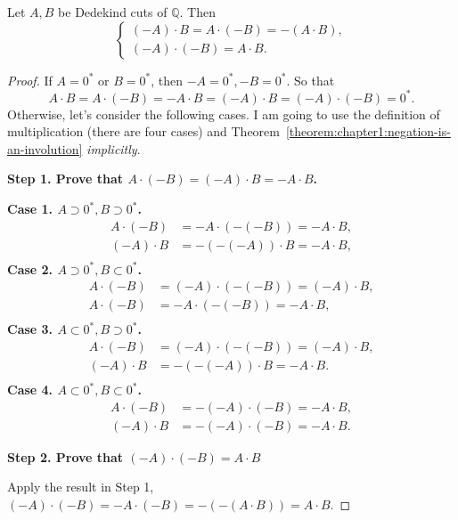 \begin{theorem}\label{theorem:chapter1:multiplication-and-negation}
    Let $A, B$ be Dedekind cuts of $\mathbb{Q}$. Then
    \[
        \begin{cases}
            (-A)\cdot B = A\cdot (-B) = -(A\cdot B), \\
            (-A)\cdot (-B) = A\cdot B.
        \end{cases}
    \]
\end{theorem}

\begin{proof}
    If $A = {0}^{*}$ or $B = {0}^{*}$, then $-A = {0}^{*}, -B = {0}^{*}$. So that
    \[
        A\cdot B = A\cdot (-B) = -A\cdot B = (-A)\cdot B = (-A)\cdot (-B) = {0}^{*}.
    \]
    Otherwise, let's consider the following cases. I am going to use the definition of multiplication (there are four cases) and Theorem~\ref{theorem:chapter1:negation-is-an-involution} \textit{implicitly}.

    \noindent\textbf{Step 1. Prove that $A\cdot (-B) = (-A)\cdot B = -A\cdot B$.}

    \noindent\textbf{Case 1. $A\supset {0}^{*}, B\supset {0}^{*}$.}
    \begin{align*}
        A\cdot (-B) & = -A\cdot (-(-B)) = -A\cdot B, \\
        (-A)\cdot B & = -(-(-A))\cdot B = -A\cdot B, \\
    \end{align*}
    \textbf{Case 2. $A\supset {0}^{*}, B\subset {0}^{*}$.}
    \begin{align*}
        A\cdot (-B) & = (-A)\cdot (-(-B)) = (-A)\cdot B, \\
        A\cdot (-B) & = -A\cdot (-(-B)) = -A\cdot B,     \\
    \end{align*}
    \textbf{Case 3. $A\subset {0}^{*}, B\supset {0}^{*}$.}
    \begin{align*}
        A\cdot (-B) & = (-A)\cdot (-(-B)) = (-A)\cdot B, \\
        (-A)\cdot B & = -(-(-A))\cdot B = -A\cdot B.     \\
    \end{align*}
    \textbf{Case 4. $A\subset {0}^{*}, B\subset {0}^{*}$.}
    \begin{align*}
        A\cdot (-B) & = -(-A)\cdot (-B) = -A\cdot B, \\
        (-A)\cdot B & = -(-A)\cdot (-B) = -A\cdot B.
    \end{align*}

    \noindent\textbf{Step 2. Prove that $(-A)\cdot (-B) = A\cdot B$}

    \noindent Apply the result in Step 1, $(-A)\cdot (-B) = -A\cdot (-B) = -(-(A\cdot B)) = A\cdot B$.
\end{proof}

